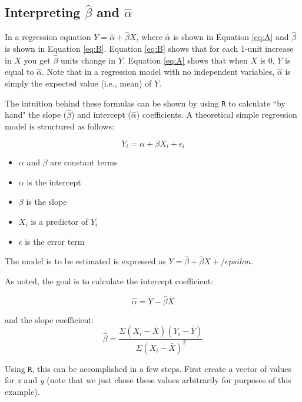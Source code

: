 \documentclass[11pt,openany]{book}\usepackage[]{graphicx}\usepackage[]{color}
\begin{document}
{\subsection{Interpreting $\hat{\beta}$ and $\hat{\alpha}$}

In a regression equation $Y=\hat{\alpha}+\hat{\beta}X$, where $\hat{\alpha}$ is shown in Equation \ref{eq:A} and $\hat{\beta}$ is shown in Equation \ref{eq:B}. Equation \ref{eq:B} shows that for each 1-unit increase in $X$ you get $\hat{\beta}$ units change in $Y$. Equation \ref{eq:A} shows that when $X$ is $0$, $Y$ is equal to $\hat{\alpha}$. Note that in a regression model with no independent variables, $\hat{\alpha}$ is simply the expected value (i.e., mean) of $Y$. 

The intuition behind these formulas can be shown by using \texttt{R} to calculate ``by hand" the slope ($\hat{\beta}$) and intercept ($\hat{\alpha}$) coefficients. A theoretical simple regression model is structured as
follows:  

\begin{equation*}
Y_{i} = \alpha + \beta X_{i} + \epsilon_{i} 
\end{equation*}

\begin{itemize}
\item $\alpha$ and $\beta$ are constant terms
\item $\alpha$ is the intercept
\item $\beta$ is the slope
\item $X_{i}$ is a predictor of $Y_{i}$
\item $\epsilon$ is the error term
\end{itemize}

\noindent The model is to be estimated is expressed as $Y=\hat{\beta}+\hat{\beta}X+/epsilon$. 

\noindent As noted, the goal is to calculate the intercept coefficient: 

\begin{equation*}
\hat{\alpha}=\bar Y-\hat{\beta}\bar X 
\end{equation*}

\noindent and the slope
coefficient: 
\begin{equation*}
\hat{\beta}=\frac{\Sigma(X_{i}-\bar X)(Y_{i}-\bar Y)}{\Sigma(X_{i}-\bar X)^2}
\end{equation*}

Using \texttt{R}, this can be accomplished in a few steps. First create a vector of values for \textit{x} and \textit{y} (note that we just chose these values arbitrarily for purposes of this example). 

}
\end{document}
